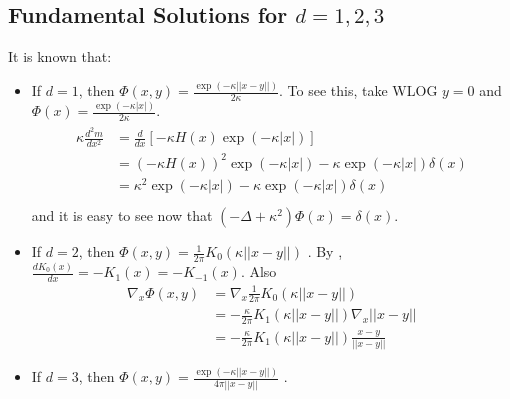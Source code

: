 \documentclass[paper=a4, fontsize=11pt]{scrartcl} %
\numberwithin{equation}{section} %
\numberwithin{figure}{section} %
\numberwithin{table}{section} %
\begin{document}



\subsection{Fundamental Solutions for $d = 1,2,3$}

It is known that:
\begin{itemize}
\item If $d = 1$, then $\Phi(x,y) = \frac{ \exp( -\kappa||x-y|| )}{2\kappa}$. To see this, take WLOG $y=0$ and $\Phi(x) = \frac{\exp(-\kappa |x| )}{2\kappa}$. 
  \begin{align}
    \begin{split}
      \kappa \frac{d^{2}m}{dx^2} &= \frac{d}{dx} [-\kappa H(x) \exp( -\kappa |x|)] \\
      & = (-\kappa H(x))^2 \exp( -\kappa |x| ) -\kappa \exp(-\kappa |x| ) \delta (x) \\ 
      & = \kappa^2 \exp( -\kappa |x| ) -\kappa \exp(-\kappa |x| ) \delta (x) \\   
    \end{split}
  \end{align}
  and it is easy to see now that $(-\Delta + \kappa^2) \Phi(x) = \delta (x)$. 
\item If $d = 2$, then $\Phi(x,y) = \frac{1}{2\pi} K_{0}( \kappa ||x-y|| ) $ \cite{wikifundamental}. By
  \cite[page 79, number (7)]{watson1995treatise}, $\frac{dK_{0}(x)}{dx} = -K_{1}(x) = -K_{-1}(x)$. Also
  \begin{align*}
    \nabla_{x} \Phi(x,y) &= \nabla_{x} \frac{1}{2\pi} K_{0}( \kappa ||x-y|| )\\
    &= -\frac{\kappa}{2\pi} K_{1}( \kappa ||x-y|| ) \nabla_{x}||x-y|| \\
    &= -\frac{\kappa}{2\pi} K_{1}(\kappa ||x-y|| ) \frac{x-y}{||x-y||}
  \end{align*}
  \item If $d = 3$, then $\Phi(x,y) = \frac{ \exp( -\kappa||x-y|| )}{4\pi||x-y||}$ \cite{wikifundamental}.
\end{itemize}
\end{document}

